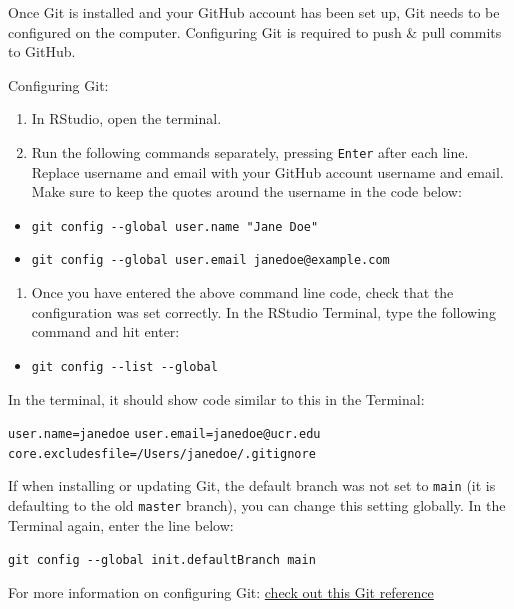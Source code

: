 \documentclass[
]{book}
\providecommand{\tightlist}{%
  \setlength{\itemsep}{0pt}\setlength{\parskip}{0pt}}
\begin{document}
Once Git is installed and your GitHub account has been set up, Git needs to be configured on the computer. Configuring Git is required to push \& pull commits to GitHub.

Configuring Git:

\begin{enumerate}
\def\labelenumi{\arabic{enumi}.}
\tightlist
\item
  In RStudio, open the terminal.
\item
  Run the following commands separately, pressing \texttt{Enter} after each line. Replace username and email with your GitHub account username and email. Make sure to keep the quotes around the username in the code below:
\end{enumerate}

\begin{itemize}
\tightlist
\item
  \texttt{git\ config\ -\/-global\ user.name\ "Jane\ Doe"}
\item
  \texttt{git\ config\ -\/-global\ user.email\ janedoe@example.com}
\end{itemize}

\begin{enumerate}
\def\labelenumi{\arabic{enumi}.}
\setcounter{enumi}{2}
\tightlist
\item
  Once you have entered the above command line code, check that the configuration was set correctly. In the RStudio Terminal, type the following command and hit enter:
\end{enumerate}

\begin{itemize}
\tightlist
\item
  \texttt{git\ config\ -\/-list\ -\/-global}
\end{itemize}

In the terminal, it should show code similar to this in the Terminal:

\texttt{user.name=janedoe}
\texttt{user.email=janedoe@ucr.edu}
\texttt{core.excludesfile=/Users/janedoe/.gitignore}

If when installing or updating Git, the default branch was not set to \texttt{main} (it is defaulting to the old \texttt{master} branch), you can change this setting globally. In the Terminal again, enter the line below:

\texttt{git\ config\ -\/-global\ init.defaultBranch\ main}

For more information on configuring Git: \href{https://git-scm.com/book/en/v2/Getting-Started-First-Time-Git-Setup}{check out this Git reference}
\end{document}
